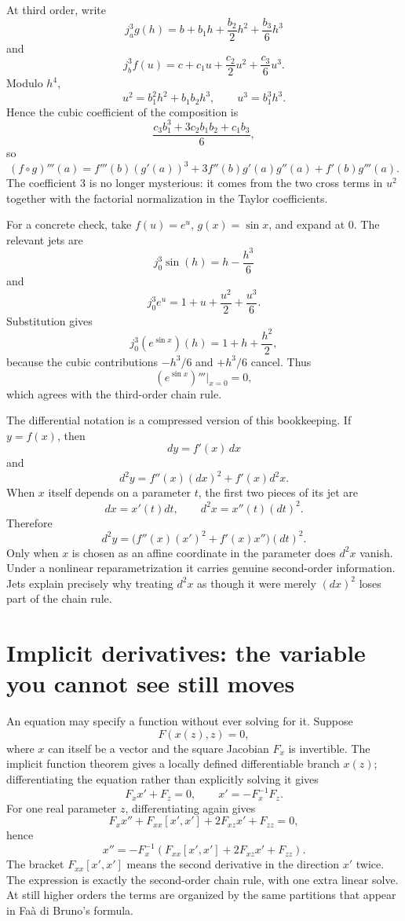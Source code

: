 At third order, write
\[
  j_a^3g(h)
  =b+b_1h+\frac{b_2}{2}h^2+\frac{b_3}{6}h^3
\]
and
\[
  j_b^3f(u)
  =c+c_1u+\frac{c_2}{2}u^2+\frac{c_3}{6}u^3.
\]
Modulo \(h^4\),
\[
  u^2=b_1^2h^2+b_1b_2h^3,
  \qquad
  u^3=b_1^3h^3.
\]
Hence the cubic coefficient of the composition is
\[
  \frac{c_3b_1^3+3c_2b_1b_2+c_1b_3}{6},
\]
so
\[
  (f\circ g)'''(a)
  =f'''(b)(g'(a))^3
  +3f''(b)g'(a)g''(a)
  +f'(b)g'''(a).
\]
The coefficient \(3\) is no longer mysterious: it comes from the two cross terms in \(u^2\) together with the factorial normalization in the Taylor coefficients.

For a concrete check, take \(f(u)=e^u\), \(g(x)=\sin x\), and expand at \(0\).  The relevant jets are
\[
  j_0^3\sin(h)=h-\frac{h^3}{6}
\]
and
\[
  j_0^3e^u=1+u+\frac{u^2}{2}+\frac{u^3}{6}.
\]
Substitution gives
\[
  j_0^3(e^{\sin x})(h)
  =1+h+\frac{h^2}{2},
\]
because the cubic contributions \(-h^3/6\) and \(+h^3/6\) cancel.  Thus
\[
  (e^{\sin x})'''\big|_{x=0}=0,
\]
which agrees with the third-order chain rule.

The differential notation is a compressed version of this bookkeeping.  If \(y=f(x)\), then
\[
  dy=f'(x)\,dx
\]
and
\[
  d^2y=f''(x)(dx)^2+f'(x)d^2x.
\]
When \(x\) itself depends on a parameter \(t\), the first two pieces of its jet are
\[
  dx=x'(t)dt,
  \qquad
  d^2x=x''(t)(dt)^2.
\]
Therefore
\[
  d^2y
  =\bigl(f''(x)(x')^2+f'(x)x''\bigr)(dt)^2.
\]
Only when \(x\) is chosen as an affine coordinate in the parameter does \(d^2x\) vanish.  Under a nonlinear reparametrization it carries genuine second-order information.  Jets explain precisely why treating \(d^2x\) as though it were merely \((dx)^2\) loses part of the chain rule.


\section{Implicit derivatives: the variable you cannot see still moves}

An equation may specify a function without ever solving for it. Suppose
\[
 F(x(z),z)=0,
\]
where $x$ can itself be a vector and the square Jacobian $F_x$ is invertible. The implicit function theorem gives a locally defined differentiable branch $x(z)$; differentiating the equation rather than explicitly solving it gives
\[
 F_x x'+F_z=0,\qquad
 \boxed{x'=-F_x^{-1}F_z.}
\]
For one real parameter $z$, differentiating again gives
\[
 F_x x''+F_{xx}[x',x']+2F_{xz}x'+F_{zz}=0,
\]
hence
\[
 \boxed{x''=-F_x^{-1}\!
  \left(F_{xx}[x',x']+2F_{xz}x'+F_{zz}\right).}
\]
The bracket $F_{xx}[x',x']$ means the second derivative in the direction $x'$ twice. The expression is exactly the second-order chain rule, with one extra linear solve. At still higher orders the terms are organized by the same partitions that appear in Fa\`a di Bruno's formula.

